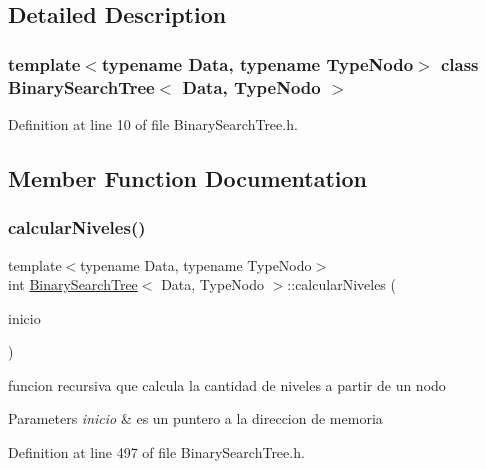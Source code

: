 \subsection{Detailed Description}
\subsubsection*{template$<$typename Data, typename Type\+Nodo$>$\newline
class Binary\+Search\+Tree$<$ Data, Type\+Nodo $>$}



Definition at line 10 of file Binary\+Search\+Tree.\+h.



\subsection{Member Function Documentation}
\mbox{\label{class_binary_search_tree_a922ad2464f2085d208847a76fca1bb51}} 
\subsubsection{\texorpdfstring{calcular\+Niveles()}{calcularNiveles()}}
{\footnotesize\ttfamily template$<$typename Data, typename Type\+Nodo$>$ \\
int \hyperlink{class_binary_search_tree}{Binary\+Search\+Tree}$<$ Data, Type\+Nodo $>$\+::calcular\+Niveles (\begin{DoxyParamCaption}\item[{\hyperlink{class_class_node}{Class\+Node}$<$ Data $>$ $\ast$}]{inicio }\end{DoxyParamCaption})\hspace{0.3cm}{\ttfamily [inline]}}



funcion recursiva que calcula la cantidad de niveles a partir de un nodo 


\begin{DoxyParams}{Parameters}
{\em inicio} & es un puntero a la direccion de memoria \\
\hline
\end{DoxyParams}


Definition at line 497 of file Binary\+Search\+Tree.\+h.

